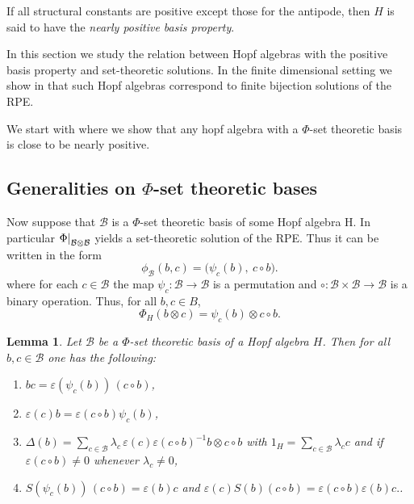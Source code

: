 \documentclass[a4paper,10pt]{amsart}
\newtheorem{lemma}{Lemma}[section]
\theoremstyle{definition}
\theoremstyle{remark}
\newcommand\D{\Delta}
\newcommand\eps{\varepsilon}
\newcommand\ot{\otimes}
\newcommand\mc{\mathcal}
\newcommand\restr[2]{{%
   \left.\kern-\nulldelimiterspace %
   #1 %
   \right|_{#2} %
   }}
\begin{document}
If all structural constants are positive except those for the antipode, then $H$ is said to have the \emph{nearly positive basis property}.

In this section we study the relation between Hopf algebras with the positive basis property and set-theoretic solutions. In the finite dimensional setting we show in  that such Hopf algebras correspond to finite bijection solutions of the RPE. 

We start with  where we show that any hopf algebra with a $\Phi$-set theoretic basis is close to be nearly positive. 


\subsection{Generalities on $\Phi$-set theoretic bases}\label{section generalitis exotic basis}

Now suppose that $\mc{B}$ is a $\Phi$-set theoretic basis of some Hopf algebra H. In particular $\restr{\Phi}{\mc{B} \ot \mc{B}}$ yields a set-theoretic solution of the RPE. Thus it can be written in the form
\begin{equation}\label{eq:psi-circ-B}
\phi_{\mc{B}}(b,c)=\bigl(\psi_c(b),\ c\circ b\bigr).
\end{equation}
where for each $c\in \mc{B}$ the map $\psi_c:\mc{B}\to \mc{B}$ is a permutation and $\circ:\mc{B}\times \mc{B}\to \mc{B}$
is a binary operation. 
Thus, for all $b,c\in B$,
\begin{equation}\label{eq:Phi-psi-circ}
\Phi_H(b\otimes c)=\psi_c(b)\otimes c\circ b.
\end{equation}


\begin{lemma}\label{lem:right-monomial}
Let $\mc{B}$ be a $\Phi$-set theoretic basis of a Hopf algebra $H$.
Then for all $b,c\in \mc{B}$ one has the following:
\begin{enumerate}
    \item[(i)]\label{bc and circ} $bc = \eps(\psi_c(b))\,(c\circ b)$,
    \item[(ii)]\label{b and psi} $\eps(c)b= \eps(c \circ b)\psi_c(b)$,
    \item[(iii)] $\D(b) = \sum_{c \in \mc{B}} \lambda_c \, \eps(c)\eps(c \circ b)^{-1}b \ot c \circ b$ with $1_H = \sum_{c \in \mc{B}} \lambda_c c$ and if $\eps(c\circ b) \neq 0$ whenever $\lambda_c \neq0$,
    \item[(iv)]\label{expression antipode general} $S(\psi_c(b))\,(c\circ b) = \eps(b) c$ and $\eps(c) S(b) (c\circ b) = \eps(c\circ b) \eps( b) c.$. 
\end{enumerate}
\end{lemma}
\end{document}
